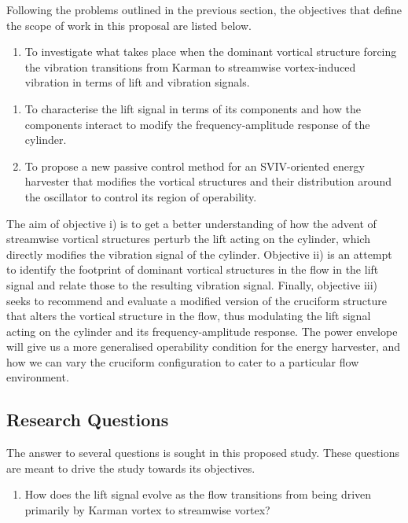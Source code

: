 \documentclass[]{article}
\begin{document}
Following the problems outlined in the previous section, the objectives
that define the scope of work in this proposal are listed below.

\begin{enumerate}
\def\labelenumi{\roman{enumi})}
\item
  To investigate what takes place when the dominant vortical structure
  forcing the vibration transitions from Karman to streamwise
  vortex-induced vibration in terms of lift and vibration signals.
\end{enumerate}

\begin{enumerate}
\def\labelenumi{\roman{enumi})}
\item
  To characterise the lift signal in terms of its components and how the
  components interact to modify the frequency-amplitude response of the
  cylinder.
\item
  To propose a new passive control method for an SVIV-oriented energy
  harvester that modifies the vortical structures and their distribution
  around the oscillator to control its region of operability.
\end{enumerate}

The aim of objective i) is to get a better understanding of how the
advent of streamwise vortical structures perturb the lift acting on the
cylinder, which directly modifies the vibration signal of the cylinder.
Objective ii) is an attempt to identify the footprint of dominant
vortical structures in the flow in the lift signal and relate those to
the resulting vibration signal. Finally, objective iii) seeks to
recommend and evaluate a modified version of the cruciform structure
that alters the vortical structure in the flow, thus modulating the lift
signal acting on the cylinder and its frequency-amplitude response. The
power envelope will give us a more generalised operability condition for
the energy harvester, and how we can vary the cruciform configuration to
cater to a particular flow environment.

\hypertarget{research-questions}{\subsection{Research
Questions}\label{research-questions}}

The answer to several questions is sought in this proposed study. These
questions are meant to drive the study towards its objectives.

\begin{enumerate}
\def\labelenumi{\roman{enumi})}
\item
  How does the lift signal evolve as the flow transitions from being
  driven primarily by Karman vortex to streamwise vortex?
\end{enumerate}
\end{document}
